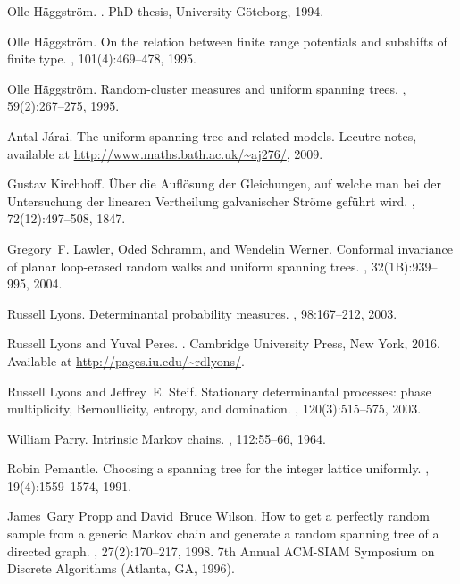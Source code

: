 \documentclass[11pt]{article}
\providecommand{\1}{\mathBB{1}}
\begin{document}
\begin{thebibliography}{10}
Olle H\"{a}ggstr\"{o}m.
.
\newblock PhD thesis, University G\"{o}te\-borg, 1994.

Olle H\"{a}ggstr\"{o}m.
\newblock On the relation between finite range potentials and subshifts of
  finite type.
, 101(4):469--478, 1995.

Olle H\"{a}ggstr\"{o}m.
\newblock Random-cluster measures and uniform spanning trees.
, 59(2):267--275, 1995.

Antal J\'{a}rai.
\newblock The uniform spanning tree and related models.
\newblock Lecutre notes, available at
  \url{http://www.maths.bath.ac.uk/~aj276/}, 2009.

Gustav Kirchhoff.
\newblock \"{U}ber die {A}ufl\"{o}sung der {G}leichungen, auf welche man bei
  der {U}ntersuchung der linearen {V}ertheilung galvanischer {S}tr\"{o}me
  gef\"{u}hrt wird.
, 72(12):497--508, 1847.

Gregory~F. Lawler, Oded Schramm, and Wendelin Werner.
\newblock Conformal invariance of planar loop-erased random walks and uniform
  spanning trees.
, 32(1B):939--995, 2004.

Russell Lyons.
\newblock Determinantal probability measures.
, 98:167--212, 2003.

Russell Lyons and Yuval Peres.
.
\newblock Cambridge University Press, New York, 2016.
\newblock Available at \url{http://pages.iu.edu/~rdlyons/}.

Russell Lyons and Jeffrey~E. Steif.
\newblock Stationary determinantal processes: phase multiplicity,
  {B}ernoullicity, entropy, and domination.
, 120(3):515--575, 2003.

William Parry.
\newblock Intrinsic {M}arkov chains.
, 112:55--66, 1964.

Robin Pemantle.
\newblock Choosing a spanning tree for the integer lattice uniformly.
, 19(4):1559--1574, 1991.

James~Gary Propp and David~Bruce Wilson.
\newblock How to get a perfectly random sample from a generic {M}arkov chain
  and generate a random spanning tree of a directed graph.
, 27(2):170--217, 1998.
\newblock 7th Annual ACM-SIAM Symposium on Discrete Algorithms (Atlanta, GA,
  1996).


\end{thebibliography}
\end{document}
